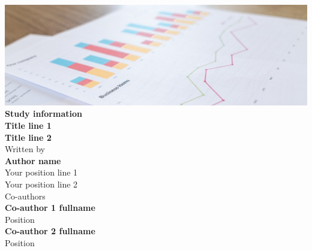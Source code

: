 \documentclass[a4paper, 12pt, openany, english]{report}
\begin{document}
\begin{titlepage}
        \begin{center}

                \includegraphics[width=1\textwidth]{img/landing/report.jpg}\\[0.2in]
                \textup{\small {\bf Study information} }\\[0.2in]
                
                \Large \textbf {Title line 1}\\
                \Large \textbf {Title line 2}\\[0.4in]
                
                
                
                \small Written by \\[0.2in]
                \textbf{Author name}\\
                Your position line 1\\
                Your position line 2\\
                
                \vspace{.2in}
                Co-authors\\[0.2in]
                \textbf{Co-author 1 fullname}\\
                Position \\
                
                \vspace{.1in}
                \textbf{Co-author 2 fullname}\\
                Position
                
                
                \vspace{.2in}
                

\end{center}
\end{titlepage}
\end{document}
